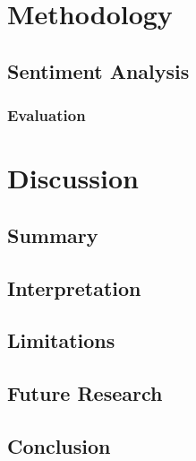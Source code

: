 \documentclass[12pt,english,titlepage,a4paper]{article}
\begin{document}



\section{Methodology}








\subsection{Sentiment Analysis}
\subsubsection{Evaluation}


\section{Discussion}
\subsection{Summary}
\subsection{Interpretation}
\subsection{Limitations}
\subsection{Future Research}
\subsection{Conclusion}


\pagebreak


\end{document}
